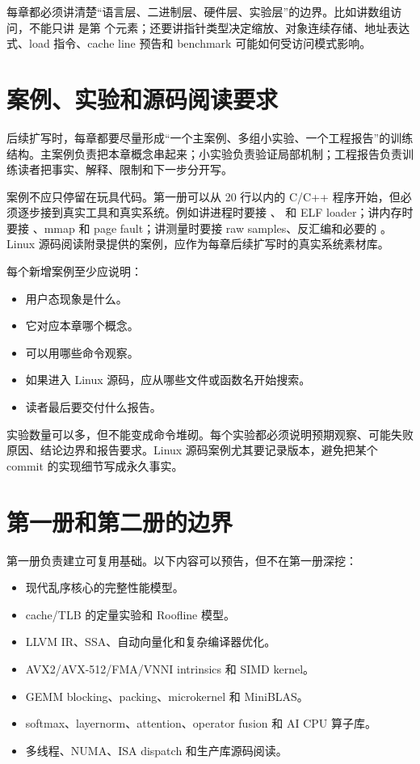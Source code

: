 每章都必须讲清楚“语言层、二进制层、硬件层、实验层”的边界。比如讲数组访问，不能只讲  是第  个元素；还要讲指针类型决定缩放、对象连续存储、地址表达式、load 指令、cache line 预告和 benchmark 可能如何受访问模式影响。

\section*{案例、实验和源码阅读要求}

后续扩写时，每章都要尽量形成“一个主案例、多组小实验、一个工程报告”的训练结构。主案例负责把本章概念串起来；小实验负责验证局部机制；工程报告负责训练读者把事实、解释、限制和下一步分开写。

案例不应只停留在玩具代码。第一册可以从 20 行以内的 C/C++ 程序开始，但必须逐步接到真实工具和真实系统。例如讲进程时要接 、 和 ELF loader；讲内存时要接 、mmap 和 page fault；讲测量时要接 raw samples、反汇编和必要的 。Linux 源码阅读附录提供的案例，应作为每章后续扩写时的真实系统素材库。

每个新增案例至少应说明：

\begin{itemize}
  \item 用户态现象是什么。
  \item 它对应本章哪个概念。
  \item 可以用哪些命令观察。
  \item 如果进入 Linux 源码，应从哪些文件或函数名开始搜索。
  \item 读者最后要交付什么报告。
\end{itemize}

实验数量可以多，但不能变成命令堆砌。每个实验都必须说明预期观察、可能失败原因、结论边界和报告要求。Linux 源码案例尤其要记录版本，避免把某个 commit 的实现细节写成永久事实。

\section*{第一册和第二册的边界}

第一册负责建立可复用基础。以下内容可以预告，但不在第一册深挖：

\begin{itemize}
  \item 现代乱序核心的完整性能模型。
  \item cache/TLB 的定量实验和 Roofline 模型。
  \item LLVM IR、SSA、自动向量化和复杂编译器优化。
  \item AVX2/AVX-512/FMA/VNNI intrinsics 和 SIMD kernel。
  \item GEMM blocking、packing、microkernel 和 MiniBLAS。
  \item softmax、layernorm、attention、operator fusion 和 AI CPU 算子库。
  \item 多线程、NUMA、ISA dispatch 和生产库源码阅读。
\end{itemize}

